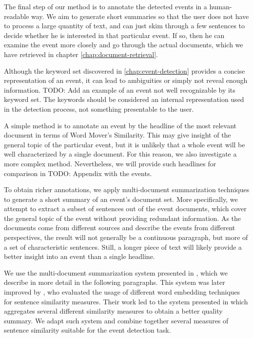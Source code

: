 The final step of our method is to annotate the detected events in a human-readable way. We aim to generate short summaries so that the user does not have to process a large quantity of text, and can just skim through a few sentences to decide whether he is interested in that particular event. If so, then he can examine the event more closely and go through the actual documents, which we have retrieved in chapter \autoref{chap:document-retrieval}.

Although the keyword set discovered in \autoref{chap:event-detection} provides a concise representation of an event, it can lead to ambiguities or simply not reveal enough information. {\color{red} TODO: Add an example of an event not well recognizable by its keyword set.} The keywords should be considered an internal representation used in the detection process, not something presentable to the user.

A simple method is to annotate an event by the headline of the most relevant document in terms of Word Mover's Similarity. This may give insight of the general topic of the particular event, but it is unlikely that a whole event will be well characterized by a single document. For this reason, we also investigate a more complex method. Nevertheless, we will provide such headlines for comparison in {\color{red} TODO: Appendix with the events}.

To obtain richer annotations, we apply multi-document summarization techniques to generate a short summary of an event's document set. More specifically, we attempt to extract a subset of sentences out of the event documents, which cover the general topic of the event without providing redundant information. As the documents come from different sources and describe the events from different perspectives, the result will not generally be a continuous paragraph, but more of a set of characteristic sentences. Still, a longer piece of text will likely provide a better insight into an event than a single headline.

We use the multi-document summarization system presented in \cite{multi-summarization-1, multi-summarization-2}, which we describe in more detail in the following paragraphs. This system was later improved by \cite{mogren-1}, who evaluated the usage of different word embedding techniques for sentence similarity measures. Their work led to the system presented in \cite{mogren-2} which aggregates several different similarity measures to obtain a better quality summary. We adapt such system and combine together several measures of sentence similarity suitable for the event detection task.


